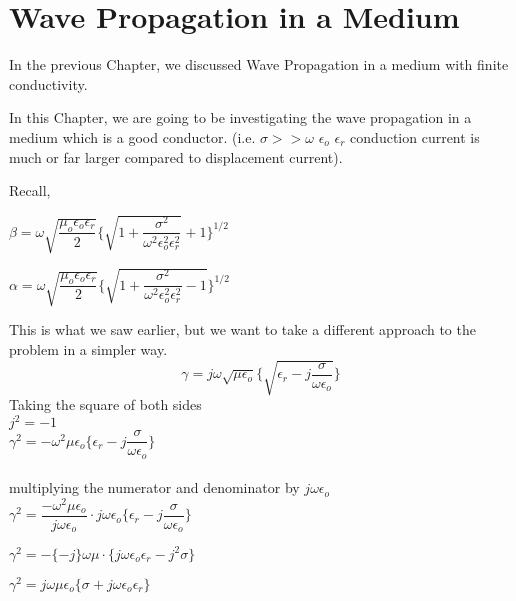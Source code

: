 \chapter{Wave Propagation in a Medium}
	In the previous Chapter, we discussed Wave Propagation in a medium with finite conductivity.
	
	In this Chapter, we are going to be investigating the wave propagation in a medium which is a good conductor. (i.e. $\sigma >>\omega$ $\epsilon_{o}$ $\epsilon_{r}$ conduction current is much or far larger compared to displacement current). \newline
		
Recall,
\begin{center}
$\beta=\omega\sqrt{\dfrac{\mu_{o}\epsilon_{o}\epsilon_{r}}{2}}\Bigg\{{\sqrt{1+\dfrac{\sigma^{2}}{\omega^{2}\epsilon_{o}^{2}\epsilon_{r}^{2}}}+1 }\Bigg\}^{1/2}$
\end{center}

\begin{center}
$\alpha=\omega\sqrt{\dfrac{\mu_{o}\epsilon_{o}\epsilon_{r}}{2}}\Bigg\{\sqrt{1+\dfrac{\sigma^{2}}{\omega^{2}\epsilon_{o}^{2}\epsilon_{r}^{2}}-1} \Bigg\}^{1/2}$	
\end{center}
	
	This is what we saw earlier, but we want to take a different approach to the problem in a simpler way.
		\begin{equation}
		 \gamma=j\omega\sqrt{\mu\epsilon_{o}}\Bigg\{\sqrt{\epsilon_{r}-j\dfrac{\sigma}{\omega\epsilon_{o}}}\Bigg\}
		 \end{equation}		
		 Taking the square of both sides\\
		$j^{2}= -1$ \\
	$\gamma^{2}=-\omega^{2}\mu\epsilon_{o}\Bigg\{\epsilon_{r}-j\dfrac{\sigma}{\omega\epsilon_{o}}\Bigg\}$\\\\
	multiplying the numerator and denominator by $j\omega\epsilon_{o}$\\
	
	$\gamma^{2}=\dfrac{-\omega^{2}\mu\epsilon_{o}}{j\omega\epsilon_{o}}\cdot j\omega\epsilon_{o}\Bigg\{\epsilon_{r}-j\dfrac{\sigma}{\omega\epsilon_{o}}\Bigg\}$\\

	\begin{center}
		$\gamma^{2}=-\{-j\}\omega\mu\cdot\{j\omega\epsilon_{o}\epsilon_{r}-j^{2}\sigma\}$
	\end{center}
		
	\begin{center}
	$\gamma^{2}=j\omega\mu\epsilon_{o}\{\sigma+j\omega\epsilon_{o}\epsilon_{r}\}$	
	\end{center}
		
